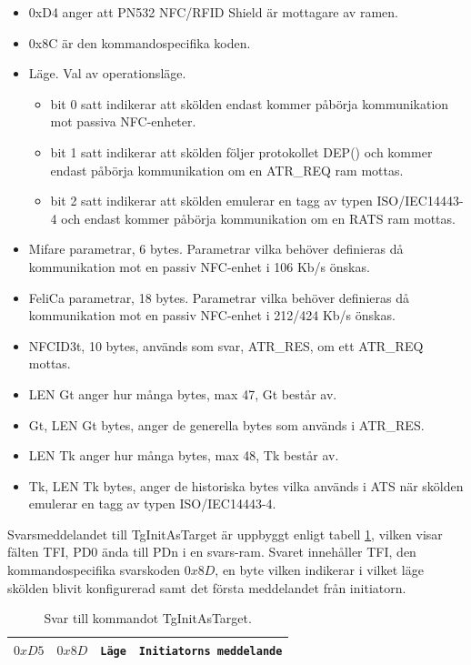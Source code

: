 \documentclass[11pt]{article}
\begin{document}
\begin{itemize}
\item 0xD4 anger att PN532 NFC/RFID Shield är mottagare av ramen.
\item 0x8C är den kommandospecifika koden.
\item Läge. Val av operationsläge. 
\begin{itemize}
\item bit 0 satt indikerar att skölden endast kommer påbörja kommunikation mot passiva NFC-enheter.
\item bit 1 satt indikerar att skölden följer protokollet DEP() och kommer endast påbörja kommunikation om en ATR\_REQ ram mottas.
\item bit 2 satt indikerar att skölden emulerar en tagg av typen ISO/IEC14443-4 och endast kommer påbörja kommunikation om en RATS ram mottas.
\end{itemize}
\item Mifare parametrar, 6 bytes. Parametrar vilka behöver definieras då kommunikation mot en passiv NFC-enhet i 106 Kb/s önskas.
\item FeliCa parametrar, 18 bytes. Parametrar vilka behöver definieras då kommunikation mot en passiv NFC-enhet i 212/424 Kb/s önskas.
\item NFCID3t, 10 bytes, används som svar, ATR\_RES, om ett ATR\_REQ mottas.
\item LEN Gt anger hur många bytes, max 47, Gt består av. 
\item Gt, LEN Gt bytes, anger de generella bytes som används i ATR\_RES.
\item LEN Tk anger hur många bytes, max 48, Tk består av.
\item Tk, LEN Tk bytes, anger de historiska bytes vilka används i ATS när skölden emulerar en tagg av typen ISO/IEC14443-4.
\end{itemize}

Svarsmeddelandet till TgInitAsTarget är uppbyggt enligt tabell \ref{tab:svar_kommando_TgInitAsTarget}, vilken visar fälten TFI, PD0 ända till PDn i en svars-ram. Svaret innehåller TFI, den kommandospecifika svarskoden $0x8D$, en byte vilken indikerar i vilket läge skölden blivit konfigurerad samt det första meddelandet från initiatorn.

\begin{table}
\centering
\begin{tabular}{ |c|c|c|c| }
\hline
$0xD5$ & $0x8D$ & \texttt{Läge} & \texttt{Initiatorns meddelande} \\
\hline
\end{tabular}
\caption{Svar till kommandot TgInitAsTarget.}
\label{tab:svar_kommando_TgInitAsTarget}
\end{table}
\end{document}
